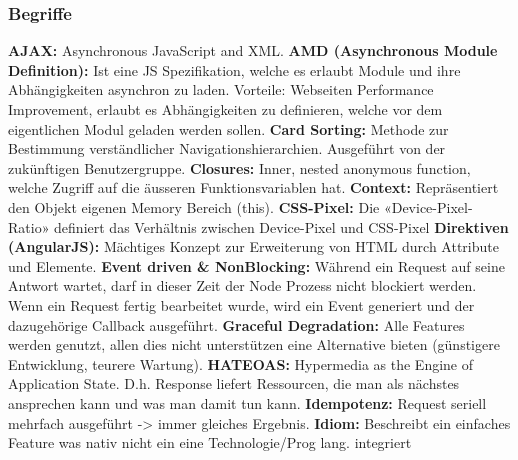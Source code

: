

\thispagestyle{fancy}
\raggedright
\footnotesize
\raggedcolumns
\begin{multicols*}{4}
\setlength{\premulticols}{1pt}
\setlength{\postmulticols}{1pt}
\setlength{\multicolsep}{1pt}
\setlength{\columnsep}{2pt}
\tiny
\subsubsection{Begriffe}
\textbf{\color{ForestGreen}AJAX:} 
Asynchronous JavaScript and XML.
\textbf{\color{ForestGreen}AMD  (Asynchronous  Module  Definition):} 
Ist  eine  JS  Spezifikation,  welche  es  erlaubt  Module 
und  ihre  Abhängigkeiten  asynchron  zu  laden.  Vorteile:  Webseiten  Performance  Improvement, 
erlaubt  es  Abhängigkeiten 
zu  definieren,  welche  vor  dem  eigentlichen  Modul  geladen  werden sollen. 
\textbf{\color{ForestGreen}Card  Sorting:}
Methode  zur  Bestimmung  verständlicher  Navigationshierarchien.  Ausgeführt  von 
der zukünftigen Benutzergruppe.
\textbf{\color{ForestGreen}Closures:} 
Inner,  nested  anonymous  function,  welche  Zugriff  auf  die  äusseren  Funktionsvariablen hat. 
\textbf{\color{ForestGreen}Context:} 
Repräsentiert den Objekt eigenen Memory Bereich (this).
\textbf{\color{ForestGreen}CSS-Pixel:} 
Die  «Device-Pixel-Ratio»  definiert  das  Verhältnis  zwischen  Device-Pixel  und  CSS-Pixel 
\textbf{\color{ForestGreen}Direktiven  (AngularJS):}  Mächtiges  Konzept  
zur  Erweiterung  von  HTML  durch  Attribute  und 
Elemente.
\textbf{\color{ForestGreen}Event driven  \&  NonBlocking:}
Während  ein  Request  auf  seine  Antwort  wartet,  darf  in  dieser 
Zeit der Node Prozess nicht blockiert werden. Wenn ein Request fertig bearbeitet wurde, wird ein 
Event generiert und der dazugehörige Callback ausgeführt.
\textbf{\color{ForestGreen}Graceful Degradation:} Alle Features werden genutzt, allen dies nicht unterstützen eine 
Alternative bieten (günstigere Entwicklung, teurere Wartung).
 \textbf{\color{ForestGreen}HATEOAS:} 
Hypermedia  as  the  Engine  of  Application  State. 
D.h.  Response  liefert  Ressourcen, die man als nächstes 
ansprechen kann und was man damit tun kann.
\textbf{\color{ForestGreen}Idempotenz:} 
Request seriell mehrfach ausgeführt -> immer gleiches Ergebnis.
\textbf{\color{ForestGreen}Idiom:} 
Beschreibt  ein  einfaches  Feature  was  nativ  nicht  ein  eine  Technologie/Prog  lang.  integriert 

\end{multicols*}
